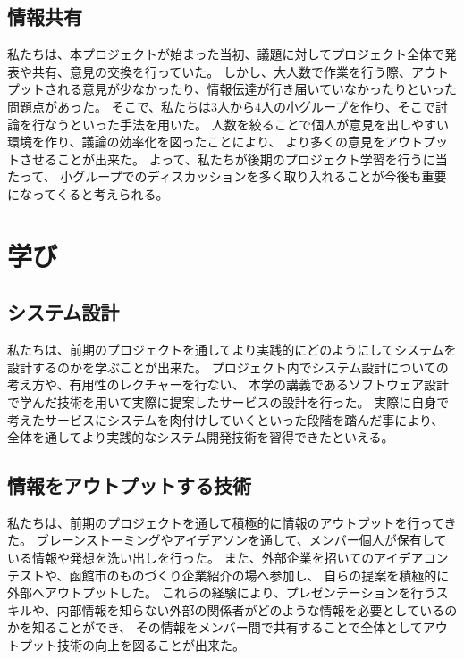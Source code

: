 \documentclass[12pt,papersize]{jsbook}
\begin{document}
\subsection{情報共有}
 私たちは、本プロジェクトが始まった当初、議題に対してプロジェクト全体で発表や共有、意見の交換を行っていた。
しかし、大人数で作業を行う際、アウトプットされる意見が少なかったり、情報伝達が行き届いていなかったりといった問題点があった。
そこで、私たちは3人から4人の小グループを作り、そこで討論を行なうといった手法を用いた。
人数を絞ることで個人が意見を出しやすい環境を作り、議論の効率化を図ったことにより、
より多くの意見をアウトプットさせることが出来た。
よって、私たちが後期のプロジェクト学習を行うに当たって、
小グループでのディスカッションを多く取り入れることが今後も重要になってくると考えられる。

\section{学び}
\subsection{システム設計}
 私たちは、前期のプロジェクトを通してより実践的にどのようにしてシステムを設計するのかを学ぶことが出来た。
プロジェクト内でシステム設計についての考え方や、有用性のレクチャーを行ない、
本学の講義であるソフトウェア設計で学んだ技術を用いて実際に提案したサービスの設計を行った。
実際に自身で考えたサービスにシステムを肉付けしていくといった段階を踏んだ事により、
全体を通してより実践的なシステム開発技術を習得できたといえる。
\subsection{情報をアウトプットする技術}
 私たちは、前期のプロジェクトを通して積極的に情報のアウトプットを行ってきた。
ブレーンストーミングやアイデアソンを通して、メンバー個人が保有している情報や発想を洗い出しを行った。
また、外部企業を招いてのアイデアコンテストや、函館市のものづくり企業紹介の場へ参加し、
自らの提案を積極的に外部へアウトプットした。
これらの経験により、プレゼンテーションを行うスキルや、内部情報を知らない外部の関係者がどのような情報を必要としているのかを知ることができ、
その情報をメンバー間で共有することで全体としてアウトプット技術の向上を図ることが出来た。
\end{document}
